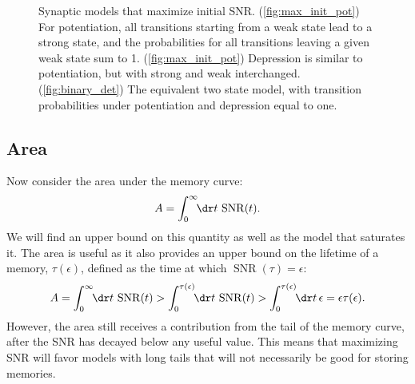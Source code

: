 \documentclass{article} %
\DeclareMathOperator{\snr}{SNR}
\begin{document}
\begin{figure}
 \begin{center}
 \begin{myenuma}
  \item\hp{}\label{fig:max_init_pot}\hp
  \item{}\label{fig:max_init_dep}\hp
  \item\hp{}\label{fig:binary_det}
  \end{myenuma}
 \end{center}
  \caption{Synaptic models that maximize initial SNR.
  (\ref{fig:max_init_pot}) For potentiation, all transitions starting from a weak state lead to a strong state, and the probabilities for all transitions leaving a given weak state sum to 1.
  (\ref{fig:max_init_pot}) Depression is similar to potentiation, but with strong and weak interchanged.
  (\ref{fig:binary_det}) The equivalent two state model, with transition probabilities under potentiation and depression equal to one.
  }\label{fig:max_init}
\end{figure}


\subsection{Area}\label{sec:area}

Now consider the area under the memory curve:
%
\begin{equation}\label{eq:area}
  A = \int_0^\infty\!\!\dr t \, \snr(t).
\end{equation}
%
We will find an upper bound on this quantity as well as the model that saturates it.
The area is useful as it also provides an upper bound on the lifetime of a memory, $\tau(\epsilon)$, defined as the time at which $\snr(\tau)=\epsilon$:
%
\begin{equation}\label{eq:arealife}
  A = \int_0^\infty\!\!\dr t \, \snr(t)
    > \int_0^{\tau(\epsilon)}\!\!\dr t \, \snr(t)
    > \int_0^{\tau(\epsilon)}\!\!\dr t \, \epsilon
    = \epsilon \tau(\epsilon).
\end{equation}
%
However, the area still receives a contribution from the tail of the memory curve, after the SNR has decayed below any useful value.
This means that maximizing SNR will favor models with long tails that will not necessarily be good for storing memories.
\end{document}
